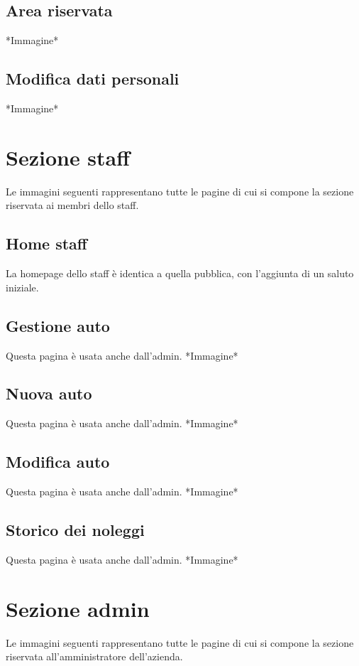 \documentclass[12pt,a4paperS]{report}
\begin{document}
\begin{normalsize}
			\subsection{Area riservata}
				*Immagine*
			
			\subsection{Modifica dati personali}
				*Immagine*
				
		\section{Sezione staff}
			Le immagini seguenti rappresentano tutte le pagine di cui si compone la sezione riservata ai membri dello staff.
			
			\subsection{Home staff}
				La homepage dello staff è identica a quella pubblica, con l'aggiunta di un saluto iniziale.
			
			\subsection{Gestione auto}
				Questa pagina è usata anche dall'admin.
				\newline
				*Immagine*
			
			\subsection{Nuova auto}
				Questa pagina è usata anche dall'admin.
				\newline
				*Immagine*
			
			\subsection{Modifica auto}
				Questa pagina è usata anche dall'admin.
				\newline
				*Immagine*
			
			\subsection{Storico dei noleggi}
				Questa pagina è usata anche dall'admin.
				\newline
				*Immagine*
				
		\section{Sezione admin}
			Le immagini seguenti rappresentano tutte le pagine di cui si compone la sezione riservata all'amministratore dell'azienda.
			

\end{normalsize}
\end{document}
